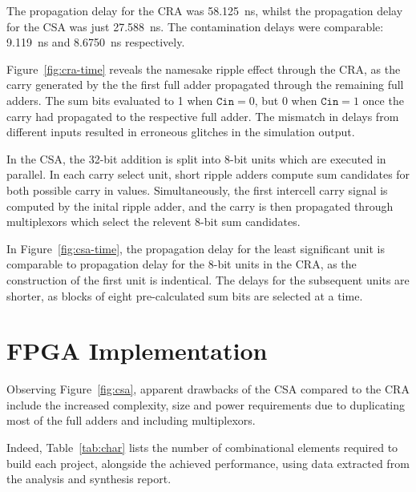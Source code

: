 \documentclass[a4paper,11pt]{article}
\begin{document}
The propagation delay for the CRA was \SI{58.125}{\ns}, whilst the propagation delay for the CSA was just \SI{27.588}{\ns}. The contamination delays were comparable: \SI{9.119}{\ns} and \SI{8.6750}{\ns} respectively.

Figure~\ref{fig:cra-time} reveals the namesake ripple effect through the CRA, as the carry generated by the the first full adder propagated through the remaining full adders. The sum bits evaluated to 1 when $\mathtt{Cin}=0$, but 0 when $\mathtt{Cin}=1$ once the carry had propagated to the respective full adder. The mismatch in delays from different inputs resulted in erroneous glitches in the simulation output.

In the CSA, the 32-bit addition is split into 8-bit units which are executed in parallel. In each carry select unit, short ripple adders compute sum candidates for both possible carry in values. Simultaneously, the first intercell carry signal is computed by the inital ripple adder, and the carry is then propagated through multiplexors which select the relevent 8-bit sum candidates.

In Figure~\ref{fig:csa-time}, the propagation delay for the least significant unit is comparable to propagation delay for the 8-bit units in the CRA, as the construction of the first unit is indentical. The delays for the subsequent units are shorter, as blocks of eight pre-calculated sum bits are selected at a time.

\section{FPGA Implementation}

Observing Figure~\ref{fig:csa}, apparent drawbacks of the CSA compared to the CRA include the increased complexity, size and power requirements due to duplicating most of the full adders and including multiplexors.

Indeed, Table~\ref{tab:char} lists the number of combinational elements required to build each project, alongside the achieved performance, using data extracted from the analysis and synthesis report.
\end{document}
